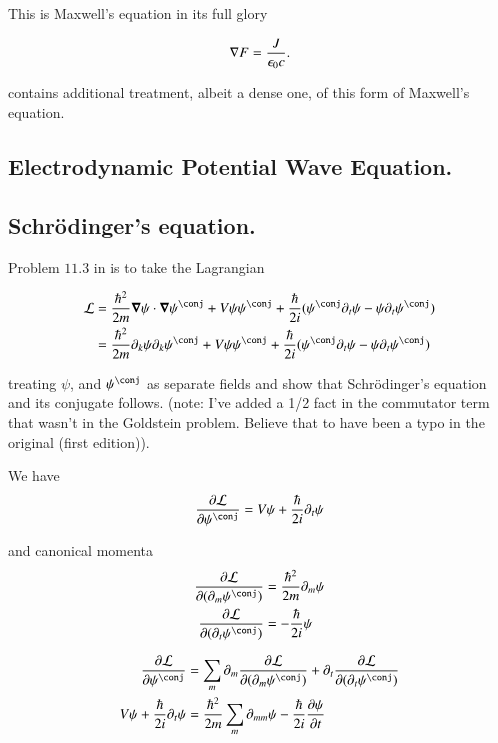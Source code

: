 This is Maxwell's equation in its full glory

\begin{align}
\nabla F = \frac{J}{\epsilon_0 c}.
\end{align}

\cite{doran2003gap} contains additional treatment, albeit a dense one, of 
this form of Maxwell's equation.

\subsection{Electrodynamic Potential Wave Equation. }

\subsection{Schr\"{o}dinger's equation. }

Problem $11.3$ in \cite{goldstein1951cm} is to take the Lagrangian

\begin{align*}
\LL 
&= \frac{\hbar^2}{2 m} \spacegrad \psi \cdot \spacegrad \psi^\conj + V \psi \psi^\conj + \frac{\hbar}{2i} ( \psi^\conj \partial_t \psi - \psi \partial_t \psi^\conj ) \\
&= \frac{\hbar^2}{2 m} \partial_k \psi \partial_k \psi^\conj + V \psi \psi^\conj + 
\frac{\hbar}{2i} ( \psi^\conj \partial_t \psi - \psi \partial_t \psi^\conj ) \\
\end{align*}

treating $\psi$, and $\psi^\conj$ as separate fields and show that Schr\"{o}dinger's equation and its conjugate follows.  (note: I've added a 1/2 fact in the
commutator term that wasn't in the Goldstein problem.  Believe that to have been a typo in the original (first edition)).

We have
\begin{align*}
\PD{\psi^\conj}{\LL} &= V\psi + \frac{\hbar}{2i} \partial_t \psi \\
\end{align*}

and canonical momenta
\begin{align*}
\PD{(\partial_m \psi^\conj)}{\LL} &= \frac{\hbar^2}{2 m} \partial_{m} \psi \\
\PD{(\partial_t \psi^\conj)}{\LL} &= -\frac{\hbar}{2i} {\psi} \\
\end{align*}

\begin{align*}
\PD{\psi^\conj}{\LL} &= \sum_m \partial_m \PD{(\partial_m \psi^\conj)}{\LL} + \partial_t \PD{(\partial_t \psi^\conj)}{\LL} \\
V\psi + \frac{\hbar}{2i} \partial_t \psi &= \frac{\hbar^2}{2 m} \sum_m \partial_{mm} \psi -\frac{\hbar}{2i} \PD{t}{\psi} \\
\end{align*}

